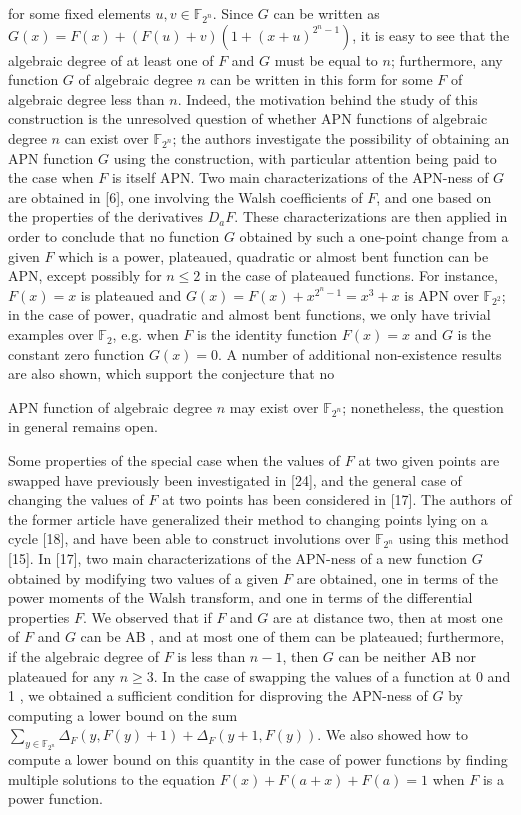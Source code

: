 \documentclass[10pt]{article}
\begin{document}
for some fixed elements $u, v \in \mathbb{F}_{2^{n}}$. Since $G$ can be written as $G(x)=F(x)+(F(u)+v)\left(1+(x+u)^{2^{n}-1}\right)$, it is easy to see that the algebraic degree of at least one of $F$ and $G$ must be equal to $n$; furthermore, any function $G$ of algebraic degree $n$ can be written in this form for some $F$ of algebraic degree less than $n$. Indeed, the motivation behind the study of this construction is the unresolved question of whether APN functions of algebraic degree $n$ can exist over $\mathbb{F}_{2^{n}}$; the authors investigate the possibility of obtaining an APN function $G$ using the construction, with particular attention being paid to the case when $F$ is itself APN. Two main characterizations of the APN-ness of $G$ are obtained in [6], one involving the Walsh coefficients of $F$, and one based on the properties of the derivatives $D_{a} F$. These characterizations are then applied in order to conclude that no function $G$ obtained by such a one-point change from a given $F$ which is a power, plateaued, quadratic or almost bent function can be APN, except possibly for $n \leq 2$ in the case of plateaued functions. For instance, $F(x)=x$ is plateaued and $G(x)=F(x)+x^{2^{n}-1}=x^{3}+x$ is APN over $\mathbb{F}_{2^{2}}$; in the case of power, quadratic and almost bent functions, we only have trivial examples over $\mathbb{F}_{2}$, e.g. when $F$ is the identity function $F(x)=x$ and $G$ is the constant zero function $G(x)=0$. A number of additional non-existence results are also shown, which support the conjecture that no

APN function of algebraic degree $n$ may exist over $\mathbb{F}_{2^{n}}$; nonetheless, the question in general remains open.

Some properties of the special case when the values of $F$ at two given points are swapped have previously been investigated in [24], and the general case of changing the values of $F$ at two points has been considered in [17]. The authors of the former article have generalized their method to changing points lying on a cycle [18], and have been able to construct involutions over $\mathbb{F}_{2^{n}}$ using this method [15]. In [17], two main characterizations of the APN-ness of a new function $G$ obtained by modifying two values of a given $F$ are obtained, one in terms of the power moments of the Walsh transform, and one in terms of the differential properties $F$. We observed that if $F$ and $G$ are at distance two, then at most one of $F$ and $G$ can be AB , and at most one of them can be plateaued; furthermore, if the algebraic degree of $F$ is less than $n-1$, then $G$ can be neither AB nor plateaued for any $n \geq 3$. In the case of swapping the values of a function at 0 and 1 , we obtained a sufficient condition for disproving the APN-ness of $G$ by computing a lower bound on the sum $\sum_{y \in \mathbb{F}_{2^{n}}} \Delta_{F}(y, F(y)+1)+\Delta_{F}(y+1, F(y))$. We also showed how to compute a lower bound on this quantity in the case of power functions by finding multiple solutions to the equation $F(x)+F(a+x)+F(a)=1$ when $F$ is a power function.
\end{document}
